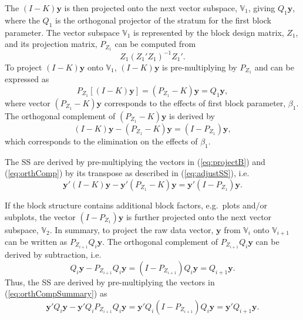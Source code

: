 \documentclass[article]{jss}
\begin{document}
The $(I-K)\bm{y}$ is then projected onto the next vector subspace, $\mathbb{V}_1$, giving $Q_{1}\bm{y}$, where the $Q_{1}$ is the orthogonal projector of the stratum for the first block parameter. The vector subspace $\mathbb{V}_1$ is represented by the block design matrix, $Z_1$, and its projection matrix, $P_{Z_1}$ can be computed from 
\[Z_1(Z_1'Z_1)^{-1}Z_1'.\] 
To project $(I-K)\bm{y}$ onto $\mathbb{V}_1$, $(I-K)\bm{y}$ is pre-multiplying by $P_{Z_1}$ and can be expressed as
\begin{equation}\label{eq:projectB}
P_{Z_1}[(I - K)\bm{y}] = (P_{Z_1} - K)\bm{y} = Q_{1}\bm{y},
\end{equation}
where vector $(P_{Z_1} - K)\bm{y}$ corresponds to the effects of first block parameter, $\beta_1$. The orthogonal complement of $(P_{Z_1} - K)\bm{y}$ is derived by
\begin{equation}
\label{eq:orthComp}
(I - K)\bm{y}- (P_{Z_1} - K)\bm{y} = (I - P_{Z_1})\bm{y},
\end{equation}
which corresponds to the elimination on the effects of $\beta_1$. 

The SS are derived by pre-multiplying the vectors in (\ref{eq:projectB}) and (\ref{eq:orthComp}) by its transpose as described in (\ref{eq:adjustSS}), i.e.\ 
\[
\bm{y}'(I - K)\bm{y}- \bm{y}'(P_{Z_1} - K)\bm{y} = \bm{y}'(I - P_{Z_1})\bm{y}.
\]

If the block structure contains additional block factors, e.g.\ plots and/or subplots, the vector $(I - P_{Z_1})\bm{y}$ is further projected onto the next vector subspace, $\mathbb{V}_2$. In summary, to project the raw data vector, $\bm{y}$ from $\mathbb{V}_{i}$ onto $\mathbb{V}_{i + 1}$ can be written as $P_{Z_{i+1}}Q_{i}\bm{y}$. The orthogonal complement of $P_{Z_{i+1}}Q_{i}\bm{y}$ can be derived by subtraction, i.e.\
\begin{equation}
\label{eq:orthCompSummary}
Q_{i}\bm{y}- P_{Z_{i+1}}Q_{i}\bm{y} = (I -P_{Z_{i+1}})Q_{i}\bm{y} = Q_{i+ 1}\bm{y}.
\end{equation}
Thus, the SS are derived by pre-multiplying the vectors in (\ref{eq:orthCompSummary}) as 
\[
\bm{y}'Q_{i}\bm{y}- \bm{y}'Q_{i}P_{Z_{i+1}}Q_{i}\bm{y} = \bm{y}'Q_{i}(I -P_{Z_{i+1}})Q_{i}\bm{y}=\bm{y}'Q_{i+ 1}\bm{y}.
\]

\end{document}
